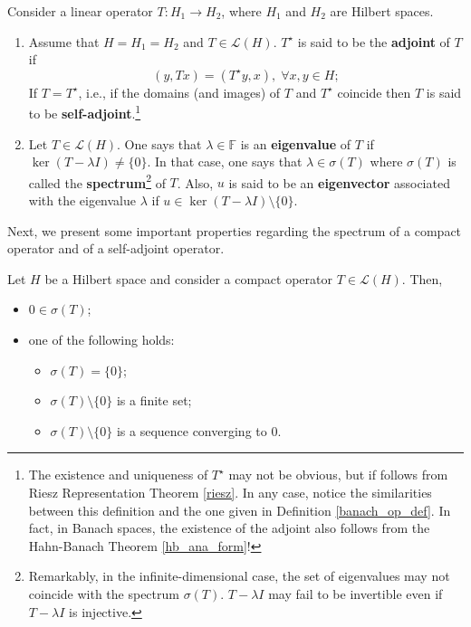 \begin{definition}
    Consider a linear operator \(T: H_1 \rightarrow H_2\), where \(H_1\) and \(H_2\) are Hilbert spaces.
    \begin{enumerate}
        \item Assume that \(H = H_1=H_2\) and \(T \in \mathcal{L}(H)\). \(T^\star\) is said to be the \textbf{adjoint} of \(T\) if
        \[
        (y, T x) = (T^\star y, x), \; \forall x, y \in H;
        \]
        If \(T=T^\star\), i.e., if the domains (and images) of \(T\) and \(T^\star\) coincide then \(T\) is said to be \textbf{self-adjoint}.\footnote{The existence and uniqueness of \(T^\star\) may not be obvious, but if follows from Riesz Representation Theorem \ref{riesz}. In any case, notice the similarities between this definition and the one given in Definition \eqref{banach_op_def}. In fact, in Banach spaces, the existence of the adjoint also follows from the Hahn-Banach Theorem \ref{hb_ana_form}!}
        \item Let \(T \in \mathcal{L}(H)\). One says that \(\lambda \in \mathbb{F}\) is an \textbf{eigenvalue} of \(T\) if \(\ker(T - \lambda I) \neq \{0\}\). In that case, one says that \(\lambda \in \sigma(T)\) where \(\sigma(T)\) is called the \textbf{spectrum}\footnote{Remarkably, in the infinite-dimensional case, the set of eigenvalues may not coincide with the spectrum \(\sigma(T)\). \(T - \lambda I\) may fail to be invertible even if \(T - \lambda I\) is injective.} of \(T\). Also, \(u\) is said to be an \textbf{eigenvector} associated with the eigenvalue \(\lambda\) if \(u \in \ker(T-\lambda I)\setminus \{0\}\).
    \end{enumerate}
\end{definition}
Next, we present some important properties regarding the spectrum of a compact operator and of a self-adjoint operator.
\begin{proposition}
    Let \(H\) be a Hilbert space and consider a compact operator \(T \in \mathcal{L}(H)\). Then,
    \begin{itemize}
        \item \(0 \in \sigma(T)\);
        \item one of the following holds:
        \begin{itemize}
            \item \(\sigma(T) = \{0\}\);
            \item \(\sigma(T)\setminus\{0\}\) is a finite set;
            \item \(\sigma(T)\setminus\{0\}\) is a sequence converging to \(0\).
        \end{itemize} 
    \end{itemize}
\end{proposition}
